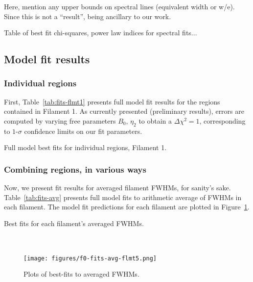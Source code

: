 \documentclass[12pt,preprint]{aastex}  %
\begin{document}
Here, mention any upper bounds on spectral lines (equivalent width or w/e).
Since this is not a ``result'', being ancillary to our work.

Table of best fit chi-squares, power law indices for spectral fits...

\subsection{Model fit results}

\subsubsection{Individual regions}

First, Table~\ref{tab:fits-flmt1} presents full model fit results for the regions
contained in Filament 1.  As currently presented (preliminary results), errors
are computed by varying free parameters $B_0$, $\eta_2$ to obtain a
$\Delta\chi^2 = 1$, corresponding to $1$-$\sigma$ confidence limits on our fit
parameters.

\begin{table*}[ht]
\scriptsize
\centering
\caption{Full model best fits for individual regions, Filament 1.
\label{tab:fits-flmt1}}

\end{table*}

\subsubsection{Combining regions, in various ways}

Now, we present fit results for averaged filament FWHMs, for sanity's sake.
Table~\ref{tab:fits-avg} presents full model fits to arithmetic average of
FWHMs in each filament.  The model fit predictions for each filament are
plotted in Figure~\ref{fig:fits-avg}.

\begin{table*}
\scriptsize
\centering
\caption{Best fits for each filament's averaged FWHMs.
\label{tab:fits-avg}}

\end{table*}

\begin{figure}
\centering
{} \\
 \\
\texttt{[image: figures/f0-fits-avg-flmt5.png]}
\caption{Plots of best-fits to averaged FWHMs.}
\label{fig:fits-avg}
\end{figure}
\end{document}

